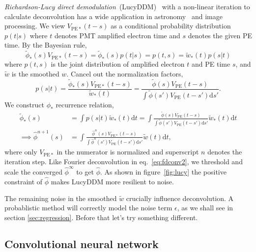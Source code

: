 \textit{Richardson-Lucy direct demodulation}~(LucyDDM)~\cite{lucy_iterative_1974} with a non-linear iteration to calculate deconvolution has a wide application in astronomy~\cite{li_richardson-lucy_2019} and image processing. We view $V_{\mathrm{PE}*}(t-s)$ as a conditional probability distribution $p(t|s)$ where $t$ denotes PMT amplified electron time and $s$ denotes the given PE time. By the Bayesian rule,
\begin{equation}
  \label{eq:lucy}
  \tilde{\phi}_*(s) V_{\mathrm{PE}*}(t-s) = \tilde{\phi}_*(s)p(t|s) = p(t,s) = \tilde{w}_*(t)p(s|t)
\end{equation}
where $p(t, s)$ is the joint distribution of amplified electron $t$ and PE time $s$, and $\tilde{w}$ is the smoothed $w$.  Cancel out the normalization factors,
\begin{equation}
  \label{eq:ptt}
  p(s|t) = \frac{\tilde{\phi}_*(s) V_{\mathrm{PE}*}(t-s)}{\tilde{w}_*(t)} = \frac{\tilde{\phi}(s) V_{\mathrm{PE}}(t-s)}{\int\tilde{\phi}(s') V_{\mathrm{PE}}(t-s')\mathrm{d}s'}.
\end{equation}
We construct $\phi_*$ recurrence relation,
\begin{equation}
  \label{eq:iter}
  \begin{aligned}
    \tilde{\phi}_*(s) & = \int p(s|t) \tilde{w}_*(t)\mathrm{d}t = \int \frac{\tilde{\phi}(s) V_{\mathrm{PE}}(t-s)}{\int\tilde{\phi}(s') V_{\mathrm{PE}}(t-s')\mathrm{d}s'} \tilde{w}_*(t) \mathrm{d}t \\
    \implies \hat{\phi}^{n+1}(s) & = \int \frac{\hat{\phi}^n(s) V_{\mathrm{PE}*}(t-s)}{\int\hat{\phi}^n(s') V_{\mathrm{PE}}(t-s')\mathrm{d}s'} \tilde{w}(t) \mathrm{d}t,
  \end{aligned}
\end{equation}
where only $V_{\mathrm{PE}*}$ in the numerator is normalized and superscript $n$ denotes the iteration step.
Like Fourier deconvolution in eq.~\eqref{eq:fdconv2}, we threshold and scale the converged $\hat{\phi}^\infty$ to get $\hat{\phi}$.  As shown in figure~\ref{fig:lucy} the positive constraint of $\hat{\phi}$ makes LucyDDM more resilient to noise.

The remaining noise in the smoothed $\tilde{w}$ crucially influence deconvolution.  A probablistic method will correctly model the noise term $\epsilon$, as we shall see in section \ref{sec:regression}.  Before that let's try something different.

\subsection{Convolutional neural network}

